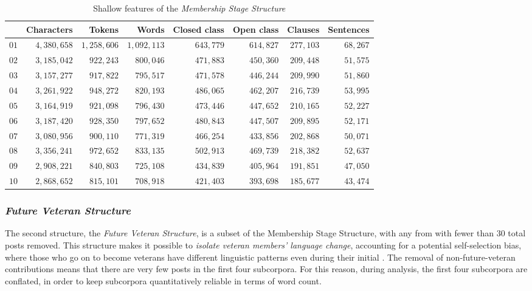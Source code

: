 \begin{table}[htb]
\centering
\small
\begin{tabular}{lrrrrrrr}
\toprule
{} &  Characters &   Tokens &    Words &  Closed class &  Open class &  Clauses &  Sentences \\
\midrule
$01$ &     $4,380,658$ & $1,258,606$   &  $1,092,113$ &        $643,779$ &      $614,827$ &   $277,103$ &      $68,267$ \\
$02$ &     $3,185,042$ &   $922,243$   &    $800,046$ &        $471,883$ &      $450,360$ &   $209,448$ &      $51,575$ \\
$03$ &     $3,157,277$ &   $917,822$   &    $795,517$ &        $471,578$ &      $446,244$ &   $209,990$ &      $51,860$ \\
$04$ &     $3,261,922$ &   $948,272$   &    $820,193$ &        $486,065$ &      $462,207$ &   $216,739$ &      $53,995$ \\
$05$ &     $3,164,919$ &   $921,098$   &    $796,430$ &        $473,446$ &      $447,652$ &   $210,165$ &      $52,227$ \\
$06$ &     $3,187,420$ &   $928,350$   &    $797,652$ &        $480,843$ &      $447,507$ &   $209,895$ &      $52,171$ \\
$07$ &     $3,080,956$ &   $900,110$   &    $771,319$ &        $466,254$ &      $433,856$ &   $202,868$ &      $50,071$ \\
$08$ &     $3,356,241$ &   $972,652$   &    $833,135$ &        $502,913$ &      $469,739$ &   $218,382$ &      $52,637$ \\
$09$ &     $2,908,221$ &   $840,803$   &    $725,108$ &        $434,839$ &      $405,964$ &   $191,851$ &      $47,050$ \\
$10$ &     $2,868,652$ &   $815,101$   &    $708,918$ &        $421,403$ &      $393,698$ &   $185,677$ &      $43,474$ \\
\bottomrule
\end{tabular}
\caption{Shallow features of the \emph{Membership Stage Structure}}
\label{tab:shallow_P}
\end{table}

\subsubsection*{\emph{Future Veteran Structure}}

The second structure, the \emph{Future Veteran Structure}, is a subset of the Membership Stage Structure, with any  from  with fewer than 30 total \glspl{post} removed. This structure makes it possible to \emph{isolate veteran members' language change}, accounting for a potential self\hyp{}selection bias, where those who go on to become veterans have different linguistic patterns even during their initial . The removal of non\hyp{}future\hyp{}veteran contributions means that there are very few \glspl{post} in the first four subcorpora. For this reason, during analysis, the first four subcorpora are conflated, in order to keep subcorpora quantitatively reliable in terms of word count.

